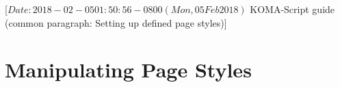 %
%
%
%
%
%
%
%
% 
%
%
%
%

                 [$Date: 2018-02-05 01:50:56 -0800 (Mon, 05 Feb 2018) $
                  KOMA-Script guide (common paragraph: 
                                     Setting up defined page styles)]


\section{Manipulating Page Styles}
\BeginIndexGroup
{}

